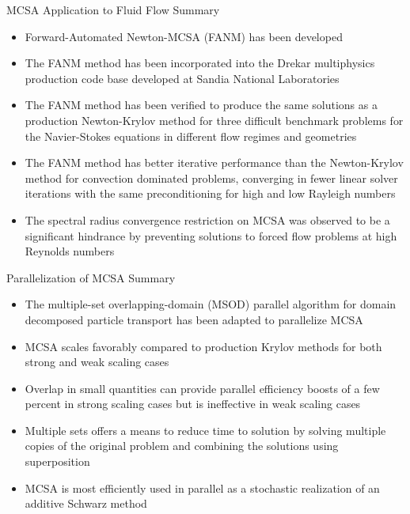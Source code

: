 \documentclass{beamer}
\begin{document}
\begin{frame}{MCSA Application to Fluid Flow Summary}

  \small{
    \begin{itemize}
    \item Forward-Automated Newton-MCSA (FANM) has been developed
      \medskip
    \item The FANM method has been incorporated into the Drekar
      multiphysics production code base developed at Sandia National
      Laboratories
      \medskip
    \item The FANM method has been verified to produce the same solutions
      as a production Newton-Krylov method for three difficult benchmark
      problems for the Navier-Stokes equations in different flow regimes
      and geometries
      \medskip
    \item The FANM method has better iterative performance than the
      Newton-Krylov method for convection dominated problems, converging
      in fewer linear solver iterations with the same preconditioning for
      high and low Rayleigh numbers
      \medskip
    \item The spectral radius convergence restriction on MCSA was observed
      to be a significant hindrance by preventing solutions to forced flow
      problems at high Reynolds numbers
    \end{itemize}
  }

\end{frame}

\begin{frame}{Parallelization of MCSA Summary}

  \small{
    \begin{itemize}
    \item The multiple-set overlapping-domain (MSOD) parallel
      algorithm for domain decomposed particle transport has been
      adapted to parallelize MCSA
      \medskip
    \item MCSA scales favorably compared to production Krylov methods for
      both strong and weak scaling cases
      \medskip
    \item Overlap in small quantities can provide parallel efficiency
      boosts of a few percent in strong scaling cases but is
      ineffective in weak scaling cases
      \medskip
    \item Multiple sets offers a means to reduce time to solution by
      solving multiple copies of the original problem and combining the
      solutions using superposition
      \medskip
    \item MCSA is most efficiently used in parallel as a stochastic
      realization of an additive Schwarz method
    \end{itemize}
  }

\end{frame}
\end{document}

